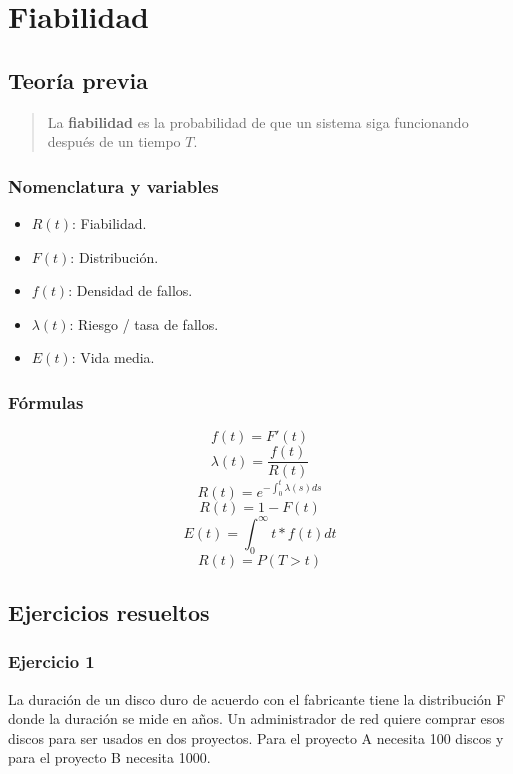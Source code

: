 \chapter{Fiabilidad}
\noindent
\section{Teoría previa}
\begin{quote}
    La \textbf{fiabilidad} es la probabilidad de que un sistema siga funcionando después de un tiempo $T$.
\end{quote}

\subsection{Nomenclatura y variables}
\begin{itemize}
    \item $R(t)$: Fiabilidad.
    \item $F(t)$: Distribución.
    \item $f(t)$: Densidad de fallos.
    \item $\lambda(t)$: Riesgo / tasa de fallos.
    \item $E(t)$: Vida media.
\end{itemize}
\subsection{Fórmulas}
\begin{multicols}{3}
\[f(t) = F'(t)\]
\[\lambda(t) = \frac{f(t)}{R(t)}\]
\[R(t) = e^{-\int_0^t \lambda(s) ds}\]
\[R(t) = 1 - F(t)\]
\[E(t)= \int_0^{\infty}t*f(t)dt\]
\[R(t)= P(T>t)\]
\end{multicols}

\newpage
\section{Ejercicios resueltos}
\subsection{Ejercicio 1}
La duración de un disco duro de acuerdo con el fabricante tiene la distribución F donde la duración se mide en años. Un administrador de red quiere comprar esos discos para ser usados en dos proyectos. Para el proyecto A necesita 100 discos y para el proyecto B necesita 1000.


